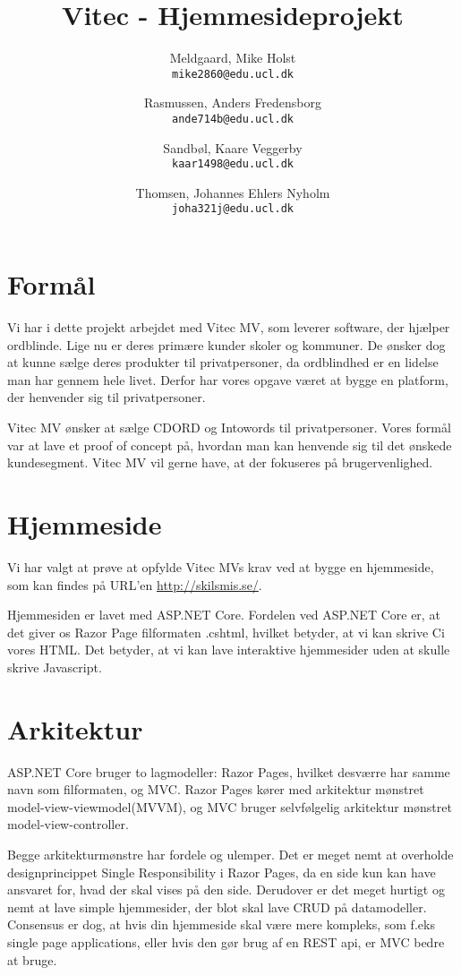 \documentclass[a4paper]{article}
\title{Vitec - Hjemmesideprojekt}
\author{
    Meldgaard, Mike Holst\\
    \texttt{mike2860@edu.ucl.dk}
    \and
    Rasmussen, Anders Fredensborg\\
    \texttt{ande714b@edu.ucl.dk}
    \and
    Sandbøl, Kaare Veggerby\\
    \texttt{kaar1498@edu.ucl.dk}
    \and
    Thomsen, Johannes Ehlers Nyholm\\
    \texttt{joha321j@edu.ucl.dk}
    }
\newcommand{\CS}{C\nolinebreak\hspace{-.05em}\raisebox{.6ex}{\tiny\bf \#}}
\begin{document}
\maketitle

\newpage

\tableofcontents

\newpage

\section{Formål}

Vi har i dette projekt arbejdet med Vitec MV, som leverer software, der hjælper ordblinde.
Lige nu er deres primære kunder skoler og kommuner.
De ønsker dog at kunne sælge deres produkter til privatpersoner, da ordblindhed er en lidelse man har gennem hele livet.
Derfor har vores opgave været at bygge en platform, der henvender sig til privatpersoner.

Vitec MV ønsker at sælge CDORD og Intowords til privatpersoner. Vores formål var at lave et proof of concept på, hvordan man kan henvende sig til det ønskede kundesegment.
Vitec MV vil gerne have, at der fokuseres på brugervenlighed.

\section{Hjemmeside}

Vi har valgt at prøve at opfylde Vitec MVs krav ved at bygge en hjemmeside, som kan findes på URL'en \url{http://skilsmis.se/}.

Hjemmesiden er lavet med ASP.NET Core.
Fordelen ved ASP.NET Core er, at det giver os Razor Page filformaten .cshtml, hvilket betyder, at vi kan skrive \CS i vores HTML.
Det betyder, at vi kan lave interaktive hjemmesider uden at skulle skrive Javascript.

\section{Arkitektur}

ASP.NET Core bruger to lagmodeller: Razor Pages, hvilket desværre har samme navn som filformaten, og MVC.
Razor Pages kører med arkitektur mønstret model-view-viewmodel(MVVM), og MVC bruger selvfølgelig arkitektur mønstret model-view-controller.

Begge arkitekturmønstre har fordele og ulemper.
Det er meget nemt at overholde designprincippet Single Responsibility i Razor Pages, da en side kun kan have ansvaret for, hvad der skal vises på den side.
Derudover er det meget hurtigt og nemt at lave simple hjemmesider, der blot skal lave CRUD på datamodeller.
Consensus er dog, at hvis din hjemmeside skal være mere kompleks, som  f.eks single page applications, eller hvis den gør brug af en REST api, er MVC bedre at bruge.
\end{document}
